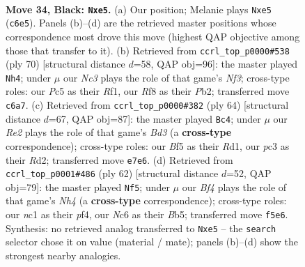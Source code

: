 \documentclass[11pt]{article}
\begin{document}
\clearpage

\begin{figure}[p]\centering
\begin{subfigure}{0.46\textwidth}\centering
\resizebox{\linewidth}{!}{%
\newchessgame
\chessboard[
  setfen={5r2/4r1k1/ppn5/2p1Pb2/P5p1/2P5/1K4PP/2N1RBNR b - - 0 34},
  showmover=false,
  pgfstyle=straightmove, color=movearrow, markmove={c6-e5}
]}
\caption{}
\end{subfigure}\hfill
\begin{subfigure}{0.46\textwidth}\centering
\resizebox{\linewidth}{!}{%
\newchessgame
\chessboard[
  setfen={3r3k/2r2pn1/pp5p/2p1PP2/P2p4/5N1P/1PPR1K2/5R2 w - - 1 36},
  showmover=false,
  pgfstyle=straightmove, color=movearrow, markmove={f3-h4}
]}
\caption{}
\end{subfigure}
\\[4pt]
\begin{subfigure}{0.46\textwidth}\centering
\resizebox{\linewidth}{!}{%
\newchessgame
\chessboard[
  setfen={2nr4/1b1r1pk1/p5p1/p1pP4/5KPp/1PNB1P1P/3R4/3R4 w - - 0 33},
  showmover=false,
  pgfstyle=straightmove, color=movearrow, markmove={d3-c4}
]}
\caption{}
\end{subfigure}\hfill
\begin{subfigure}{0.46\textwidth}\centering
\resizebox{\linewidth}{!}{%
\newchessgame
\chessboard[
  setfen={rn1r2k1/5pb1/8/pBp3P1/5p1N/P2p4/1P6/2KR3R w - - 0 32},
  showmover=false,
  pgfstyle=straightmove, color=movearrow, markmove={h4-f5}
]}
\caption{}
\end{subfigure}
\caption{\textbf{Move 34, Black: \texttt{Nxe5}.} (a) Our position; Melanie plays \texttt{Nxe5} (\texttt{c6e5}). Panels (b)--(d) are the retrieved master positions whose correspondence most drove this move (highest QAP objective among those that transfer to it). (b) Retrieved from \texttt{ccrl\_top\_p0000\#538} (ply 70) [structural distance $d$=58, QAP obj=96]: the master played \texttt{Nh4}; under $\mu$ our \emph{Nc3} plays the role of that game's \emph{Nf3}; cross-type roles: our \emph{P}c5 as their \emph{R}f1, our \emph{R}f8 as their \emph{P}b2; transferred move \texttt{c6a7}. (c) Retrieved from \texttt{ccrl\_top\_p0000\#382} (ply 64) [structural distance $d$=67, QAP obj=87]: the master played \texttt{Bc4}; under $\mu$ our \emph{Re2} plays the role of that game's \emph{Bd3} (a \textbf{cross-type} correspondence); cross-type roles: our \emph{B}f5 as their \emph{R}d1, our \emph{p}c3 as their \emph{R}d2; transferred move \texttt{e7e6}. (d) Retrieved from \texttt{ccrl\_top\_p0001\#486} (ply 62) [structural distance $d$=52, QAP obj=79]: the master played \texttt{Nf5}; under $\mu$ our \emph{Bf4} plays the role of that game's \emph{Nh4} (a \textbf{cross-type} correspondence); cross-type roles: our \emph{n}c1 as their \emph{p}f4, our \emph{N}c6 as their \emph{B}b5; transferred move \texttt{f5e6}. Synthesis: no retrieved analog transferred to \texttt{Nxe5} -- the \texttt{search} selector chose it on value (material / mate); panels (b)--(d) show the strongest nearby analogies.}
\label{fig:thought-m67}
\end{figure}
\end{document}
